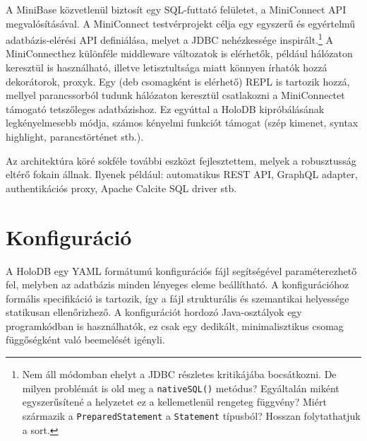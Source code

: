 \documentclass[
    parspace,
    noindent,
    nohyp,
]{elteiktdk}[2023/04/10]
\begin{document}
A MiniBase közvetlenül biztosít egy SQL-futtató felületet, a MiniConnect API megvalósításával.
A MiniConnect testvérprojekt célja egy egyszerű és egyértelmű adatbázis-elérési API definiálása,
melyet a JDBC nehézkessége inspirált.\footnote{
    Nem áll módomban ehelyt a JDBC részletes kritikájába bocsátkozni.
    De milyen problémát is old meg a \texttt{nativeSQL()} metódus?
    Egyáltalán miként egyszerűsítené a helyzetet ez a kellemetlenül rengeteg függvény?
    Miért származik a \texttt{PreparedStatement} a \texttt{Statement} típusból?
    Hosszan folytathatjuk a sort.
}
A MiniConnecthez különféle middleware változatok is elérhetők, például hálózaton keresztül is használható,
illetve letisztultsága miatt könnyen írhatók hozzá dekorátorok, proxyk.
Egy (deb csomagként is elérhető) REPL is tartozik hozzá,
mellyel parancssorból tudunk hálózaton keresztül csatlakozni a MiniConnectet támogató tetszőleges adatbázishoz.
Ez egyúttal a HoloDB kipróbálásának legkényelmesebb módja,
számos kényelmi funkciót támogat (szép kimenet, syntax highlight, parancstörténet stb.).

Az architektúra köré sokféle további eszközt fejlesztettem,
melyek a robusztusság eltérő fokain állnak.
Ilyenek például: automatikus REST API, GraphQL adapter, authentikációs proxy, Apache Calcite SQL driver stb.

\section{Konfiguráció}

A HoloDB egy YAML formátumú konfigurációs fájl segítségével paraméterezhető fel,
melyben az adatbázis minden lényeges eleme beállítható.
A konfigurációhoz formális specifikáció is tartozik,
így a fájl strukturális és szemantikai helyessége statikusan ellenőrizhező.
A konfigurációt hordozó Java-osztályok egy programkódban is használhatók,
ez csak egy dedikált, minimalisztikus csomag függőségként való beemelését igényli.
\end{document}
